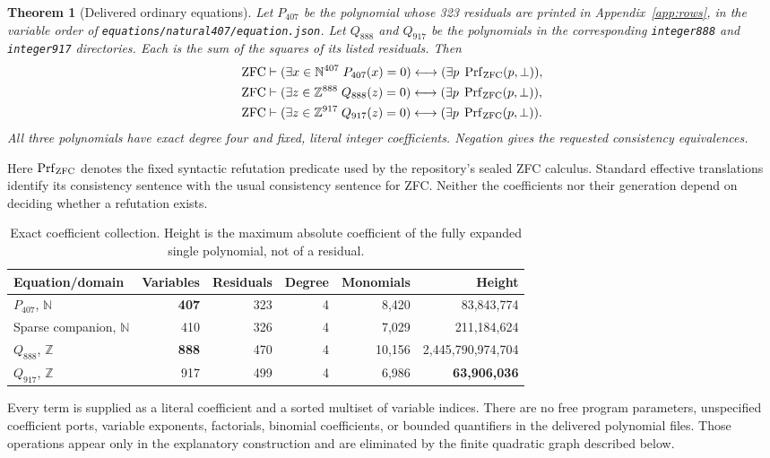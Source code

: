 \documentclass[10pt,letterpaper]{article}
\newtheorem{theorem}{Theorem}[section]
\theoremstyle{definition}\newtheorem{definition}[theorem]{Definition}
\theoremstyle{remark}\newtheorem{remark}[theorem]{Remark}
\newcommand{\N}{\mathbb N}\newcommand{\Z}{\mathbb Z}\newcommand{\Q}{\mathbb Q}
\newcommand{\ZFC}{\mathrm{ZFC}}\newcommand{\ZF}{\mathrm{ZF}}
\newcommand{\file}[1]{\texttt{\nolinkurl{#1}}}
\newcommand{\Pn}{P_{407}}\newcommand{\Pz}{Q_{888}}\newcommand{\Ps}{Q_{917}}
\begin{document}
\begin{theorem}[Delivered ordinary equations]\label{thm:main}
Let $\Pn$ be the polynomial whose 323 residuals are printed in
Appendix~\ref{app:rows}, in the variable order of
\file{equations/natural407/equation.json}. Let $\Pz$ and $\Ps$ be the
polynomials in the corresponding \file{integer888} and \file{integer917}
directories. Each is the sum of the squares of its listed residuals.
Then
\begin{align}
 \ZFC&\vdash (\exists x\in\N^{407}\;\Pn(x)=0)
       \longleftrightarrow (\exists p\;\Prf_{\ZFC}(p,\bot)),\label{eq:mainN}\\
 \ZFC&\vdash (\exists z\in\Z^{888}\;\Pz(z)=0)
       \longleftrightarrow (\exists p\;\Prf_{\ZFC}(p,\bot)),\label{eq:mainZ}\\
 \ZFC&\vdash (\exists z\in\Z^{917}\;\Ps(z)=0)
       \longleftrightarrow (\exists p\;\Prf_{\ZFC}(p,\bot)).\label{eq:mainS}
\end{align}
All three polynomials have exact degree four and fixed, literal integer
coefficients. Negation gives the requested consistency equivalences.
\end{theorem}

Here $\Prf_{\ZFC}$ denotes the fixed syntactic refutation predicate used
by the repository's sealed ZFC calculus. Standard effective translations
identify its consistency sentence with the usual consistency sentence for
ZFC. Neither the coefficients nor their generation depend on deciding
whether a refutation exists.

\begin{table}[ht]
\centering\small
\begin{tabular}{lrrrrr}
\toprule
Equation/domain & Variables & Residuals & Degree & Monomials & Height\\
\midrule
$\Pn$, $\N$ & \textbf{407} & 323 & 4 & 8,420 & 83,843,774\\
Sparse companion, $\N$ & 410 & 326 & 4 & 7,029 & 211,184,624\\
$\Pz$, $\Z$ & \textbf{888} & 470 & 4 & 10,156 & 2,445,790,974,704\\
$\Ps$, $\Z$ & 917 & 499 & 4 & 6,986 & \textbf{63,906,036}\\
\bottomrule
\end{tabular}
\caption{Exact coefficient collection. Height is the maximum absolute
coefficient of the fully expanded single polynomial, not of a residual.}
\end{table}

Every term is supplied as a literal coefficient and a sorted multiset of
variable indices. There are no free program parameters, unspecified
coefficient ports, variable exponents, factorials, binomial coefficients,
or bounded quantifiers in the delivered polynomial files. Those operations
appear only in the explanatory construction and are eliminated by the
finite quadratic graph described below.
\end{document}
